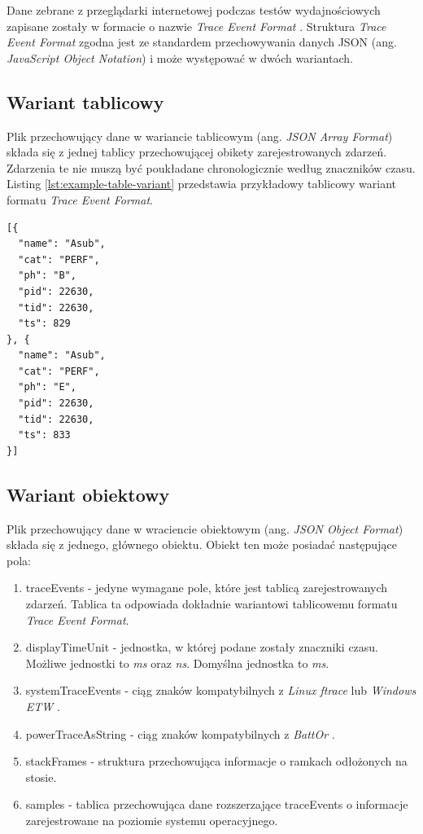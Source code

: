 \documentclass[polish, twoside, 12pt]{mwart}
\begin{document}
Dane zebrane z przeglądarki internetowej podczas testów wydajnościowych zapisane zostały w formacie o nazwie \emph{Trace Event Format} \cite{trace-event-format}. Struktura \emph{Trace Event Format} zgodna jest ze standardem przechowywania danych JSON (ang. \emph{JavaScript Object Notation}) \cite{json} i może występować w dwóch wariantach.

\subsection{Wariant tablicowy}

Plik przechowujący dane w wariancie tablicowym (ang. \emph{JSON Array Format}) składa się z jednej tablicy przechowującej obikety zarejestrowanych zdarzeń. Zdarzenia te nie muszą być poukładane chronologicznie według znaczników czasu. Listing \ref{lst:example-table-variant} przedstawia przykładowy tablicowy wariant formatu \emph{Trace Event Format}.

\begin{lstlisting}[caption=Przykładowy wariant tablicowy, label={lst:example-table-variant}]
[{
  "name": "Asub",
  "cat": "PERF",
  "ph": "B",
  "pid": 22630,
  "tid": 22630,
  "ts": 829
}, {
  "name": "Asub",
  "cat": "PERF",
  "ph": "E",
  "pid": 22630,
  "tid": 22630,
  "ts": 833
}]
\end{lstlisting}

\subsection{Wariant obiektowy}

Plik przechowujący dane w wraciencie obiektowym (ang. \emph{JSON Object Format}) składa się z jednego, głównego obiektu. Obiekt ten może posiadać następujące pola:

\begin{enumerate}
  \item traceEvents - jedyne wymagane pole, które jest tablicą zarejestrowanych zdarzeń. Tablica ta odpowiada dokładnie wariantowi tablicowemu formatu \emph{Trace Event Format}.
  \item displayTimeUnit - jednostka, w której podane zostały znaczniki czasu. Możliwe jednostki to \emph{ms} oraz \emph{ns}. Domyślna jednostka to \emph{ms}.
  \item systemTraceEvents - ciąg znaków kompatybilnych z \emph{Linux ftrace} \cite{ftrace} lub \emph{Windows ETW} \cite{etw}.
  \item powerTraceAsString - ciąg znaków kompatybilnych z \emph{BattOr} \cite {battor}.
  \item stackFrames - struktura przechowująca informacje o ramkach odłożonych na stosie.
  \item samples - tablica przechowująca dane rozszerzające traceEvents o informacje zarejestrowane na poziomie systemu operacyjnego.
\end{enumerate}
\end{document}
